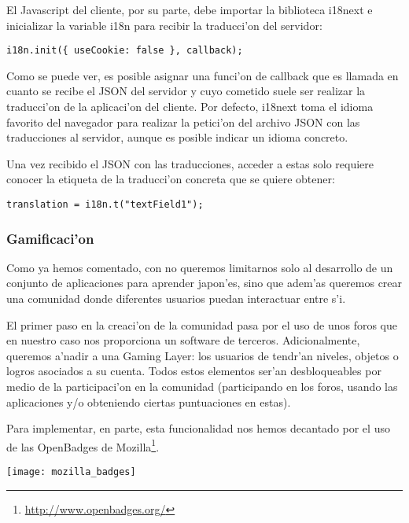 El Javascript del cliente, por su parte,  debe importar la biblioteca i18next e inicializar la variable i18n para
recibir la traducci'on del servidor:

\begin{verbatim}
i18n.init({ useCookie: false }, callback);
\end{verbatim}

Como se puede ver, es posible asignar una funci'on de callback que es llamada en cuanto se recibe el JSON del
servidor y cuyo cometido suele ser realizar la traducci'on de la aplicaci'on del cliente.
Por defecto, i18next toma el idioma favorito del navegador para realizar la petici'on del archivo JSON con las
traducciones al servidor, aunque es posible indicar un idioma concreto.

Una vez recibido el JSON con las traducciones, acceder a estas solo requiere conocer la etiqueta de la traducci'on
concreta que se quiere obtener:

\begin{verbatim}
translation = i18n.t("textField1");
\end{verbatim}

\subsubsection{Gamificaci'on}
\label{sub:gamificacion}

Como ya hemos comentado, con \Nipponline{} no queremos limitarnos solo al desarrollo de un conjunto de aplicaciones para
aprender japon'es, sino que adem'as queremos crear una comunidad donde diferentes usuarios puedan interactuar entre
s'i.

El primer paso en la creaci'on de la comunidad pasa por el uso de unos foros que en nuestro caso nos proporciona un
software de terceros. 
Adicionalmente, queremos a'nadir a \Nipponline{} una Gaming Layer: los usuarios de \Nipponline{} tendr'an niveles, objetos
o logros asociados a su cuenta. Todos estos elementos ser'an desbloqueables por medio de la participaci'on en la
comunidad (participando en los foros, usando las aplicaciones y/o obteniendo ciertas puntuaciones en estas).

Para implementar, en parte, esta funcionalidad nos hemos decantado por el uso de las OpenBadges de 
Mozilla\footnote{\url{http://www.openbadges.org/}}.

\begin{center}
\texttt{[image: mozilla\_badges]}
\end{center}

